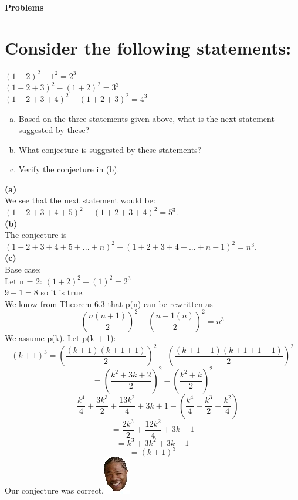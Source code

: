 \textbf{\Huge Problems}
\section{Consider the following statements:}
$(1+2)^2-1^2=2^3$\\
$(1+2+3)^2-(1+2)^2=3^3$\\
$(1+2+3+4)^2-(1+2+3)^2=4^3$\\
\begin{enumerate}[(a)]
\item Based on the three statements given above, what is the next statement suggested by these?
\item What conjecture is suggested by these statements?
\item Verify the conjecture in (b).
\end{enumerate}
\textbf{\Large(a)}\\
We see that the next statement would be: $(1+2+3+4+5)^2-(1+2+3+4)^2=5^3$.\\
\textbf{\Large(b)}\\
The conjecture is $(1+2+3+4+5+...+n)^2-(1+2+3+4+...+n-1)^2=n^3$.\\
\textbf{\Large(c)}\\
Base case:\\
Let n = 2: $(1+2)^2-(1)^2 = 2^3$\\
$9-1 = 8$ so it is true.\\
We know from Theorem 6.3 that p(n) can be rewritten as
\begin{equation}
\left(\frac{n(n+1)}{2}\right)^2 - \left(\frac{n-1(n)}{2}\right)^2 = n^3
\end{equation}
We assume p(k).
Let p(k + 1):\\
\begin{equation}
(k+1)^3 = \left(\frac{(k+1)(k+1+1)}{2}\right)^2 - \left(\frac{(k+1-1)(k+1+1-1)}{2}\right)^2 
\end{equation}
\begin{equation}
 = \left(\frac{k^2+3k+2}{2}\right)^2 - \left(\frac{k^2+k}{2}\right)^2 
\end{equation}
\begin{equation}
 = \frac{k^4}{4} + \frac{3k^3}{2} + \frac{13k^2}{4} + 3k + 1 - \left(\frac{k^4}{4} + \frac{k^3}{2} + \frac{k^2}{4}\right)
\end{equation}
\begin{equation}
 = \frac{2k^3}{2} + \frac{12k^2}{4} + 3k + 1
\end{equation}
\begin{equation}
 = k^3 + 3k^2 + 3k + 1
\end{equation}
\begin{equation}
 = (k+1)^3
\end{equation}
Our conjecture was correct.\includegraphics[scale=0.70]{billeder/xzibit}

